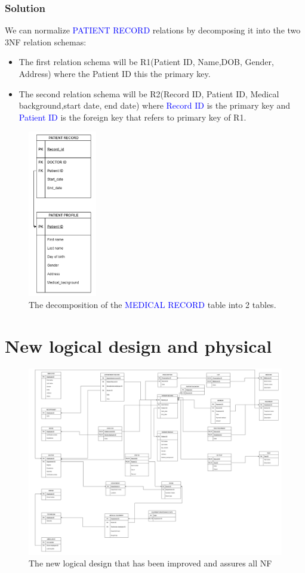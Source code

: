 \documentclass[a4paper]{article}
\numberwithin{equation}{section}
\begin{document}
\subsubsection{Solution}
We can normalize \textcolor{blue}{PATIENT RECORD} relations by decomposing it into the two 3NF relation schemas:
\begin{itemize}
  \item The first relation schema will be R1(Patient ID, Name,DOB, Gender, Address) where the Patient ID this the primary key.
  \item The second relation schema will be R2(Record ID, Patient ID, Medical background,start date, end date) where \textcolor{blue}{Record ID} is the primary key and \textcolor{blue}{Patient ID} is the foreign key that refers to primary key of R1.
\end{itemize}
\pagebreak
\begin{figure}[H]
  \centering
  \includegraphics[width = 3cm ]{assets/3NFsolution.PNG}
  \captionsetup{justification=centering,margin=2cm}
  \caption{The decomposition of the \textcolor{blue}{MEDICAL RECORD} table into 2 tables.}
\end{figure}

\section{New logical design and physical}

\begin{figure}[H]
  \centering
  \includegraphics[width = 12cm ]{assets/newLogicalDesign.png}
  \captionsetup{justification=centering,margin=2cm}
  \caption{The new logical design that has been improved and assures all NF}
\end{figure}
\end{document}

